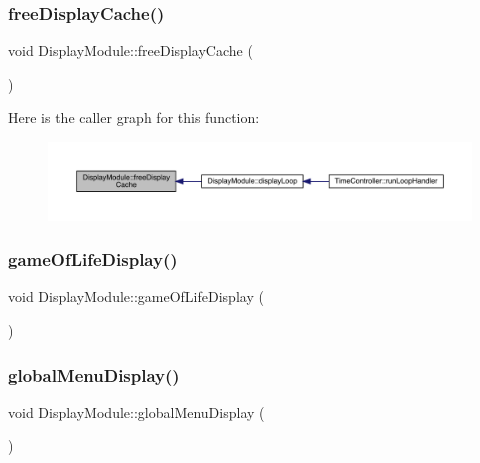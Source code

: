 \subsubsection{\texorpdfstring{free\+Display\+Cache()}{freeDisplayCache()}}
{\footnotesize\ttfamily void Display\+Module\+::free\+Display\+Cache (\begin{DoxyParamCaption}{ }\end{DoxyParamCaption})}

Here is the caller graph for this function\+:
\nopagebreak
\begin{figure}[H]
\begin{center}
\leavevmode
\includegraphics[width=350pt]{class_display_module_a4eb1fdb54d5ce4e0b8e460d30b443aac_icgraph}
\end{center}
\end{figure}
\mbox{\label{class_display_module_a38006afa64e93afb6c259b137f45bcde}} 
\subsubsection{\texorpdfstring{game\+Of\+Life\+Display()}{gameOfLifeDisplay()}}
{\footnotesize\ttfamily void Display\+Module\+::game\+Of\+Life\+Display (\begin{DoxyParamCaption}{ }\end{DoxyParamCaption})}

\mbox{\label{class_display_module_a5082cabe11332dc4a9d0daea8a60f9dc}} 
\subsubsection{\texorpdfstring{global\+Menu\+Display()}{globalMenuDisplay()}}
{\footnotesize\ttfamily void Display\+Module\+::global\+Menu\+Display (\begin{DoxyParamCaption}{ }\end{DoxyParamCaption})}

